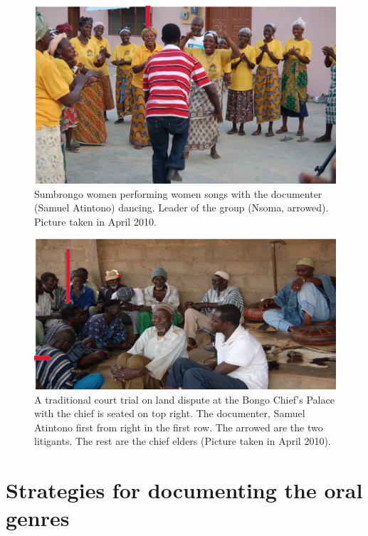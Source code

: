\documentclass[output=paper,colorlinks,citecolor=brown]{langscibook}
\begin{document}
\begin{figure}
\includegraphics[scale=0.55]{../figures/sumbrongo.png}
\caption{Sumbrongo women performing women songs with the documenter (Samuel Atintono) dancing. Leader of the group (Nsoma, arrowed). Picture taken in April 2010.}
\end{figure}

\begin{figure}
\includegraphics[scale=0.55]{../figures/bongo.png}
\caption{A traditional court trial on land dispute at the Bongo Chief’s Palace with the chief is seated 
 	on top right. The documenter, Samuel Atintono first from right in the first row. The arrowed are the 
 	two litigants. The rest are the chief elders (Picture taken in April 2010).}

\end{figure}


\section{Strategies for documenting the oral genres}
\end{document}
